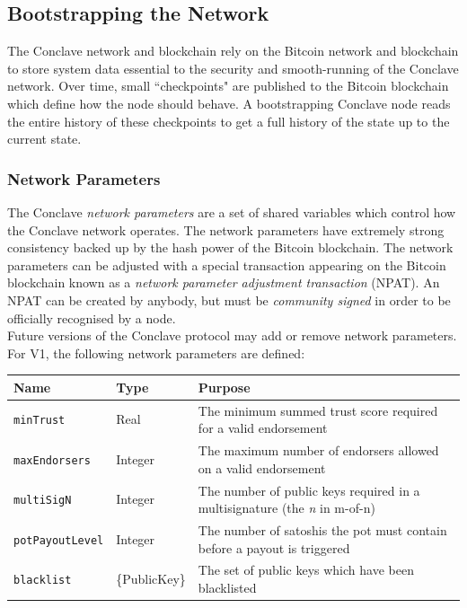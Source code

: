 \documentclass{report}
\begin{document}
		\subsection{Bootstrapping the Network}
		The Conclave network and blockchain rely on the Bitcoin network and blockchain to store system data essential to the security and smooth-running of the Conclave network. Over time, small ``checkpoints" are published to the Bitcoin blockchain which define how the node should behave. A bootstrapping Conclave node reads the entire history of these checkpoints to get a full history of the state up to the current state. 
			\subsubsection{Network Parameters}
			The Conclave \textit{network parameters} are a set of shared variables which control how the Conclave network operates. The network parameters have extremely strong consistency backed up by the hash power of the Bitcoin blockchain. The network parameters can be adjusted with a special transaction appearing on the Bitcoin blockchain known as a \textit{network parameter adjustment transaction} (NPAT). An NPAT can be created by anybody, but must be \textit{community signed} in order to be officially recognised by a node.\\
			
			Future versions of the Conclave protocol may add or remove network parameters. For V1, the following network parameters are defined: \\
			
			\begin{center}
			\bgroup
			\small
			\def\arraystretch{1.5}
			\begin{tabular}{|l|l|l|}
			\hline
			\textbf{Name} & \textbf{Type} & \textbf{Purpose} \\ \hline
			\texttt{minTrust}             & Real             & The minimum summed trust score required for a valid endorsement \\ \hline
			\texttt{maxEndorsers}             & Integer             & The maximum number of endorsers allowed on a valid endorsement \\ \hline
			\texttt{multiSigN}             & Integer             & The number of public keys required in a multisignature (the \textit{n} in m-of-n) \\ \hline
			\texttt{potPayoutLevel}        & Integer             & The number of satoshis the pot must contain before a payout is triggered \\ \hline
			\texttt{blacklist}            & \{PublicKey\}             & The set of public keys which have been blacklisted  \\ \hline
			\end{tabular}
			\egroup
			\end{center}
			
\end{document}
